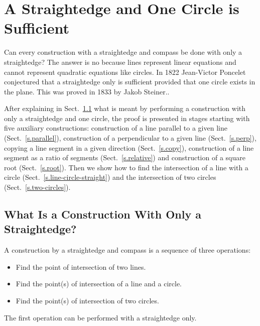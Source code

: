 
\chapter{A Straightedge and One Circle is Sufficient}\label{c.straightedge}




Can every construction with a straightedge and compass be done with only a straightedge? The answer is no because lines represent linear equations and cannot represent quadratic equations like circles. In 1822 Jean-Victor Poncelet conjectured that a straightedge only is sufficient provided that one circle exists in the plane. This was proved in 1833 by Jakob Steiner..

After explaining in Sect.~\ref{s.se-what} what is meant by performing a construction with only a straightedge and one circle, the proof is presented in stages starting with five auxiliary constructions: construction of a line parallel to a given line (Sect.~\ref{s.parallel}), construction of a perpendicular to a given line (Sect.~\ref{s.perp}), copying a line segment in a given direction (Sect.~\ref{s.copy}), construction of a line segment as a ratio of segments (Sect.~\ref{s.relative}) and construction of a square root (Sect.~\ref{s.root}). Then we show how to find the intersection of a line with a circle (Sect.~\ref{s.line-circle-straight}) and the intersection of two circles (Sect.~\ref{s.two-circles}).

\section{What Is a Construction With Only a Straightedge?}\label{s.se-what}
A construction by a straightedge and compass is a sequence of three operations:
\begin{itemize}
\item Find the point of intersection of two lines.
\item Find the point(s) of intersection of a line and a circle.
\item Find the point(s) of intersection of two circles.
\end{itemize}
The first operation can be performed with a straightedge only.

